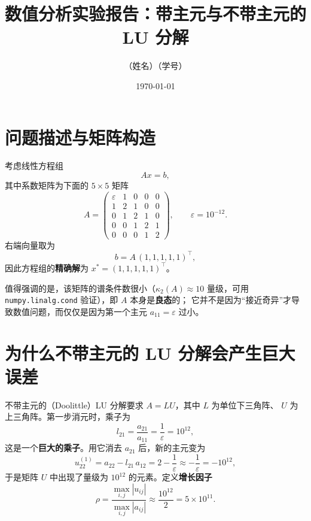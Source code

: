 \documentclass[12pt,a4paper]{ctexart}
\title{\bfseries 数值分析实验报告：带主元与不带主元的 LU 分解}
\author{（姓名）\quad （学号）}
\date{\today}
\begin{document}
\maketitle

\section{问题描述与矩阵构造}

考虑线性方程组
\begin{equation}
  Ax = b,
\end{equation}
其中系数矩阵为下面的 $5\times 5$ 矩阵
\begin{equation}
  A =
  \begin{pmatrix}
    \varepsilon & 1 & 0 & 0 & 0 \\
    1 & 2 & 1 & 0 & 0 \\
    0 & 1 & 2 & 1 & 0 \\
    0 & 0 & 1 & 2 & 1 \\
    0 & 0 & 0 & 1 & 2
  \end{pmatrix},
  \qquad
  \varepsilon = 10^{-12}.
\end{equation}
右端向量取为
\begin{equation}
  b = A\,(1,1,1,1,1)^{\top},
\end{equation}
因此方程组的\textbf{精确解}为 $x^{\ast} = (1,1,1,1,1)^{\top}$。

值得强调的是，该矩阵的谱条件数很小（$\kappa_2(A) \approx 10$ 量级，可用
\verb|numpy.linalg.cond| 验证），即 $A$ 本身是\textbf{良态}的；
它并不是因为“接近奇异”才导致数值问题，而仅仅是因为第一个主元
$a_{11}=\varepsilon$ 过小。

\section{为什么不带主元的 LU 分解会产生巨大误差}

不带主元的（Doolittle）LU 分解要求 $A=LU$，其中 $L$ 为单位下三角阵、
$U$ 为上三角阵。第一步消元时，乘子为
\begin{equation}
  l_{21} = \frac{a_{21}}{a_{11}} = \frac{1}{\varepsilon} = 10^{12},
\end{equation}
这是一个\textbf{巨大的乘子}。用它消去 $a_{21}$ 后，新的主元变为
\begin{equation}
  u_{22}^{(1)} = a_{22} - l_{21}\, a_{12}
  = 2 - \frac{1}{\varepsilon} \approx -\frac{1}{\varepsilon} = -10^{12},
\end{equation}
于是矩阵 $U$ 中出现了量级为 $10^{12}$ 的元素。定义\textbf{增长因子}
\begin{equation}
  \rho = \frac{\max_{i,j} |u_{ij}|}{\max_{i,j} |a_{ij}|}
  \approx \frac{10^{12}}{2} = 5\times 10^{11}.
\end{equation}
\end{document}
